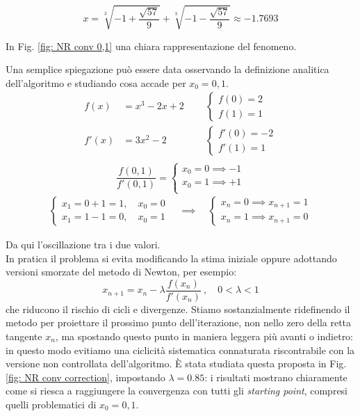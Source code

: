 \[
x = \sqrt[3]{-1 + \frac{\sqrt{57}}{9}} + \sqrt[3]{-1 - \frac{\sqrt{57}}{9}} \approx -1.7693
\]

\noindent In Fig. \ref{fig: NR conv 0,1} una chiara rappresentazione del fenomeno.

\medskip\noindent
Una semplice spiegazione può essere data osservando la definizione analitica dell'algoritmo e studiando cosa accade per $x_0=0,1$.\\
\begin{align*}
    f(x) &= x^3 - 2x +2\ \quad\quad
    \begin{cases}
    f(0) = 2 \\
    f(1) = 1
    \end{cases}\\
    f'(x) &= 3x^2 - 2 \quad\quad\quad\quad 
    \begin{cases}
    f'(0) = -2 \\
    f'(1) = 1
    \end{cases}\\
\end{align*}
\[
\frac{f(0,1)}{f'(0,1)} = \begin{cases}
    x_0 = 0 \implies -1 \\
    x_0 = 1 \implies +1 \\
\end{cases}
\]
\begin{align*}
    \begin{cases}
        x_1 = 0 + 1 = 1, \quad x_0=0\\
        x_1 = 1 - 1 = 0, \quad x_0=1
    \end{cases}
    \quad \implies \quad
    \begin{cases}
        x_n=0 \implies x_{n+1} =1 \\
        x_n=1 \implies x_{n+1} =0
    \end{cases}
\end{align*}

\noindent Da qui l'oscillazione tra i due valori.\\
In pratica il problema si evita modificando la stima iniziale oppure adottando versioni smorzate del metodo di Newton, per esempio:
\[
x_{n+1} = x_n - \lambda\frac{f(x_n)}{f'(x_n)}\ , \quad 0<\lambda<1
\]
che riducono il rischio di cicli e divergenze. Stiamo sostanzialmente ridefinendo il metodo per proiettare il prossimo punto dell'iterazione, non nello zero della retta tangente $x_n$, ma spostando questo punto in maniera leggera più avanti o indietro: in questo modo evitiamo una ciclicità sistematica connaturata riscontrabile con la versione non controllata dell'algoritmo.
È stata studiata questa proposta in Fig. \ref{fig: NR conv correction}, impostando $\lambda=0.85$: i risultati mostrano chiaramente come si riesca a raggiungere la convergenza con tutti gli \textit{starting point}, compresi quelli problematici di $x_0=0, 1$.

